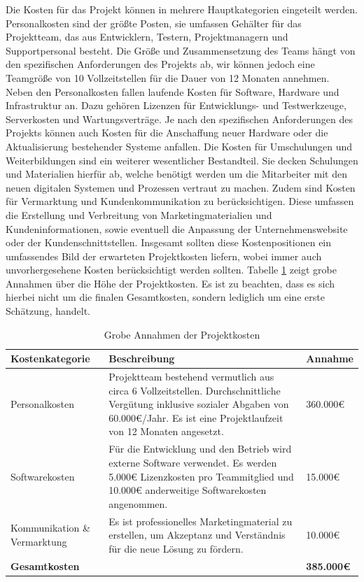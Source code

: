 Die Kosten für das Projekt können in mehrere Hauptkategorien eingeteilt werden. Personalkosten sind der größte Posten, sie umfassen Gehälter für das Projektteam, das aus Entwicklern, Testern, Projektmanagern und Supportpersonal besteht. Die Größe und Zusammensetzung des Teams hängt von den spezifischen Anforderungen des Projekts ab, wir können jedoch eine Teamgröße von 10 Vollzeitstellen für die Dauer von 12 Monaten annehmen.
Neben den Personalkosten fallen laufende Kosten für Software, Hardware und Infrastruktur an. Dazu gehören Lizenzen für Entwicklungs- und Testwerkzeuge, Serverkosten und Wartungsverträge. Je nach den spezifischen Anforderungen des Projekts können auch Kosten für die Anschaffung neuer Hardware oder die Aktualisierung bestehender Systeme anfallen.
Die Kosten für Umschulungen und Weiterbildungen sind ein weiterer wesentlicher Bestandteil. Sie decken Schulungen und Materialien hierfür ab, welche benötigt werden um die Mitarbeiter mit den neuen digitalen Systemen und Prozessen vertraut zu machen.
Zudem sind Kosten für Vermarktung und Kundenkommunikation zu berücksichtigen. Diese umfassen die Erstellung und Verbreitung von Marketingmaterialien und Kundeninformationen, sowie eventuell die Anpassung der Unternehmenswebsite oder der Kundenschnittstellen.
Insgesamt sollten diese Kostenpositionen ein umfassendes Bild der erwarteten Projektkosten liefern, wobei immer auch unvorhergesehene Kosten berücksichtigt werden sollten. Tabelle \ref{tab:anname_kosten} zeigt grobe Annahmen über die Höhe der Projektkosten. Es ist zu beachten, dass es sich hierbei nicht um die finalen Gesamtkosten, sondern lediglich um eine erste Schätzung, handelt.

\begin{table}[h!]
	\centering
	\begin{tabular}{|p{3cm}|p{8.3cm}|p{2cm}|} 
		\hline
		\textbf{Kostenkategorie} & \textbf{Beschreibung} & \textbf{Annahme}\\ [0.5ex] 
		\hline
		Personalkosten & Projektteam bestehend vermutlich aus circa 6 Vollzeitstellen. Durchschnittliche Vergütung inklusive sozialer Abgaben von 60.000€/Jahr. Es ist eine Projektlaufzeit von 12 Monaten angesetzt. & 360.000€ \\ 
		\hline
		Softwarekosten & Für die Entwicklung und den Betrieb wird externe Software verwendet. Es werden 5.000€ Lizenzkosten pro Teammitglied und 10.000€ anderweitige Softwarekosten angenommen. & 15.000€ \\ 
		\hline
		Kommunikation \& Vermarktung & Es ist professionelles Marketingmaterial zu erstellen, um Akzeptanz und Verständnis für die neue Lösung zu fördern. & 10.000€ \\ 
		\hline
		\textbf{Gesamtkosten} & & \textbf{385.000€} \\ 
		\hline
	\end{tabular}
	\caption{Grobe Annahmen der Projektkosten}
	\label{tab:anname_kosten}
\end{table}


